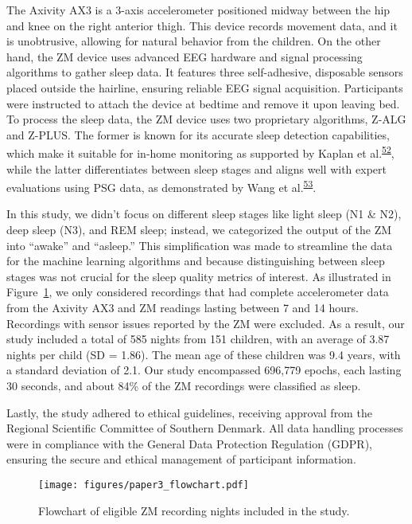 \documentclass[
  10pt,
]{scrbook}
\begin{document}
The Axivity AX3 is a 3-axis accelerometer positioned midway between the
hip and knee on the right anterior thigh. This device records movement
data, and it is unobtrusive, allowing for natural behavior from the
children. On the other hand, the ZM device uses advanced EEG hardware
and signal processing algorithms to gather sleep data. It features three
self-adhesive, disposable sensors placed outside the hairline, ensuring
reliable EEG signal acquisition. Participants were instructed to attach
the device at bedtime and remove it upon leaving bed. To process the
sleep data, the ZM device uses two proprietary algorithms, Z-ALG and
Z-PLUS. The former is known for its accurate sleep detection
capabilities, which make it suitable for in-home monitoring as supported
by Kaplan et
al.\textsuperscript{\protect\hyperlink{ref-kaplan_performance_2014}{52}},
while the latter differentiates between sleep stages and aligns well
with expert evaluations using PSG data, as demonstrated by Wang et
al.\textsuperscript{\protect\hyperlink{ref-wang_evaluation_2015}{53}}.

In this study, we didn't focus on different sleep stages like light
sleep (N1 \& N2), deep sleep (N3), and REM sleep; instead, we
categorized the output of the ZM into ``awake'' and ``asleep.'' This
simplification was made to streamline the data for the machine learning
algorithms and because distinguishing between sleep stages was not
crucial for the sleep quality metrics of interest. As illustrated in
Figure~\ref{fig-paper3_flow}, we only considered recordings that had
complete accelerometer data from the Axivity AX3 and ZM readings lasting
between 7 and 14 hours. Recordings with sensor issues reported by the ZM
were excluded. As a result, our study included a total of 585 nights
from 151 children, with an average of 3.87 nights per child (SD = 1.86).
The mean age of these children was 9.4 years, with a standard deviation
of 2.1. Our study encompassed 696,779 epochs, each lasting 30 seconds,
and about 84\% of the ZM recordings were classified as sleep.

Lastly, the study adhered to ethical guidelines, receiving approval from
the Regional Scientific Committee of Southern Denmark. All data handling
processes were in compliance with the General Data Protection Regulation
(GDPR), ensuring the secure and ethical management of participant
information.

\begin{figure}

{\centering \texttt{[image: figures/paper3\_flowchart.pdf]}

}

\caption{\label{fig-paper3_flow}Flowchart of eligible ZM recording
nights included in the study.}

\end{figure}
\end{document}
